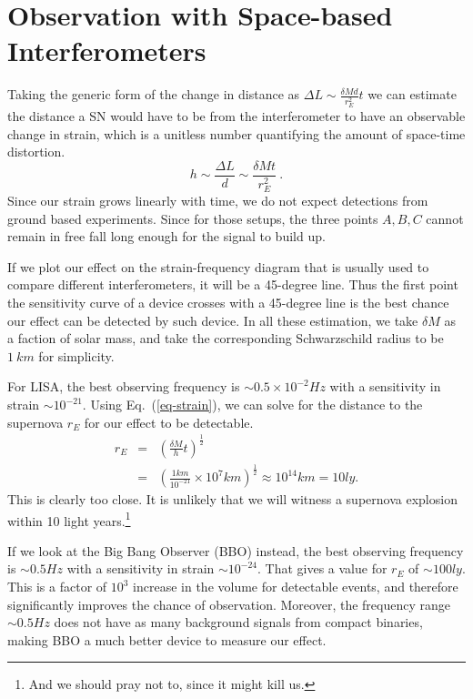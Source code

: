 \documentclass[aps,showpacs,twocolumn,floats,prd,superscriptaddress,nofootinbib]{revtex4-1}
\begin{document}
 \section{Observation with Space-based Interferometers}
\label{obs}
Taking the generic form of the change in distance as $\Delta L \sim \frac{\delta M d}{r_E^2} t$ we can estimate the distance a SN would have to be from the interferometer to have an observable change in strain, which is a unitless number quantifying the amount of space-time distortion.
\begin{equation}
h \sim \frac{\Delta L}{d} \sim \frac{\delta M t}{r_E^2}~.
\label{eq-strain}
\end{equation} 
Since our strain grows linearly with time, we do not expect detections from ground based experiments. Since for those setups, the three points $A,B,C$ cannot remain in free fall long enough for the signal to build up. 

If we plot our effect on the strain-frequency diagram \cite{GWcurves} that is usually used to compare different interferometers, it will be a 45-degree line. Thus the first point the sensitivity curve of a device crosses with a 45-degree line is the best chance our effect can be detected by such device. In all these estimation, we take $\delta M$ as a faction of solar mass, and take the corresponding Schwarzschild radius to be $1~km$ for simplicity.

For LISA, the best observing frequency is $\sim 0.5 \times10^{-2} Hz$ with a sensitivity in strain $\sim 10^{-21}$. Using Eq.~(\ref{eq-strain}), we can solve for the distance to the supernova $r_E$ for our effect to be detectable.
\begin{eqnarray}
	r_E & = &  \left(  \frac{\delta M}{h} t \right)^\frac{1}{2} \label{Meas}	\\
	& = &  \left( \frac{1 km}{10^{-21}} \times 10^7 km \right)^\frac{1}{2} \approx 10^{14} km = 10 ly.
\end{eqnarray}
This is clearly too close. It is unlikely that we will witness a supernova explosion within 10 light years.\footnote{And we should pray not to, since it might kill us.}

If we look at the Big Bang Observer (BBO) instead, the best observing frequency is $\sim 0.5 Hz$ with a sensitivity in strain $\sim 10^{-24}$. That gives a value for $r_E$ of $\sim 100 ly$. This is a factor of $10^3$ increase in the volume for detectable events, and therefore significantly improves the chance of observation. Moreover, the frequency range $\sim 0.5 Hz$ does not have as many background signals from compact binaries, making BBO a much better device to measure our effect.
\end{document}
